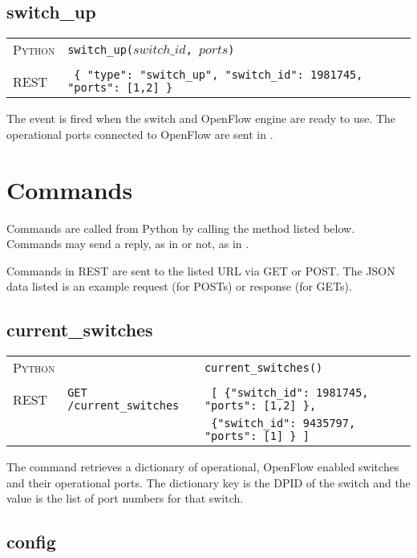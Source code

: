 \subsection{switch\_up}

\bigskip
\begin{tabularx}{\linewidth}{lX}
\textsc{Python}   & \texttt{switch\_up($switch\_id$, $ports$)} \\ \\
\textsc{REST} & \texttt{ \{ "type": "switch\_up", "switch\_id": 1981745, "ports": [1,2] \} } 
\end{tabularx}

The  event is fired when the switch and OpenFlow engine are ready to use.  The
operational ports connected to OpenFlow are sent in .  

\section{Commands}
\label{reference:commands}

Commands are called from Python by calling the method listed below.  Commands may send a reply, as in
 or not, as in .

Commands in REST are sent to the listed URL via GET or POST.  The JSON data listed is an example
request (for POSTs) or response (for GETs). 

\subsection{current\_switches}

\bigskip
\begin{tabularx}{\linewidth}{lXX}
\textsc{Python} &  & \texttt{current\_switches()} \\ \\
\textsc{REST} & \texttt{GET /current\_switches} & 
  \texttt{ [ \{"switch\_id": 1981745, "ports": [1,2] \}, } \\
  & & \texttt{ \{"switch\_id": 9435797, "ports": [1] \} ] } 
\end{tabularx}

The  command retrieves a dictionary of operational, OpenFlow enabled switches
and their operational ports.  The dictionary key is the DPID of the switch and the value is the
list of port numbers for that switch.    

\subsection{config}

